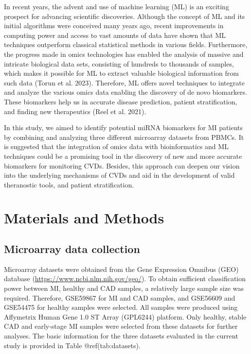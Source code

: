 \documentclass[smallextended]{svjour3}       %
\begin{document}
In recent years, the advent and use of machine learning (ML) is an
exciting prospect for advancing scientific discoveries. Although the
concept of ML and its initial algorithms were conceived many years ago,
recent improvements in computing power and access to vast amounts of
data have shown that ML techniques outperform classical statistical
methods in various fields. Furthermore, the progress made in omics
technologies has enabled the analysis of massive and intricate
biological data sets, consisting of hundreds to thousands of samples,
which makes it possible for ML to extract valuable biological
information from such data (Torun et al. 2023). Therefore, ML offers
novel techniques to integrate and analyze the various omics data
enabling the discovery of de novo biomarkers. These biomarkers help us
in accurate disease prediction, patient stratification, and finding new
therapeutics (Reel et al. 2021).

In this study, we aimed to identify potential miRNA biomarkers for MI
patients by combining and analyzing three different microarray datasets
from PBMCs. It is suggested that the integration of omics data with
bioinformatics and ML techniques could be a promising tool in the
discovery of new and more accurate biomarkers for monitoring CVDs.
Besides, this approach can deepen our vision into the underlying
mechanisms of CVDs and aid in the development of valid theranostic
tools, and patient stratification.

\hypertarget{materials-and-methods}{%
\section{Materials and Methods}\label{materials-and-methods}}

\hypertarget{microarray-data-collection}{%
\subsection{Microarray data
collection}\label{microarray-data-collection}}

Microarray datasets were obtained from the Gene Expression Omnibus (GEO)
database (\url{https://www.ncbi.nlm.nih.gov/geo/}). To obtain sufficient
classification power between MI, healthy and CAD samples, a relatively
large sample size was required. Therefore, GSE59867 for MI and CAD
samples, and GSE56609 and GSE54475 for healthy samples were selected.
All samples were produced using Affymetrix Human Gene 1.0 ST Array
(GPL6244) platform. Only healthy, stable CAD and early-stage MI samples
were selected from these datasets for further analyses. The basic
information for the three datasets evaluated in the current study is
provided in Table @ref(tab:datasets).
\end{document}
